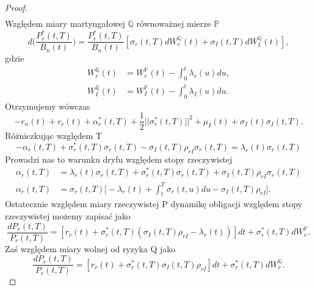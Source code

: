 \documentclass{mini}
\theoremstyle{mythstyle}
\begin{document}
\begin{proof}
\begin{align*}
	\end{align*}
	Względem miary martyngałowej $\mathbb{Q}$ równoważnej mierze $\mathbb{P}$
	\begin{equation*}
	d\bigg(	\frac{P_r^*(t,T)}{B_n(t)}\bigg) = \frac{P_r^*(t,T)}{B_n(t)} [\sigma_r(t,T)dW_r^\mathbb{Q}(t) + \sigma_I(t,T)dW_I^\mathbb{Q}(t)],
	\end{equation*}
	gdzie
	\begin{align*}
	W_r^\mathbb{Q}(t) &= W_r^\mathbb{P}(t) - \int_{0}^{t} \lambda_r(u) du, \\
	W_I^\mathbb{Q}(t) &= W_I^\mathbb{P}(t) - \int_{0}^{t} \lambda_I(u) du.
	\end{align*}
	Otrzymujemy wówczas
	\begin{equation}
	-r_n(t) + r_r(t) + \alpha_r^*(t,T) + \frac{1}{2} ||\sigma_r^*(t,T)||^2 + \mu_I(t) + \sigma_I(t)\sigma_I(t,T).
	\end{equation}
	Różniczkując względem T
	\begin{equation}
	-\alpha_r(t,T) + \sigma_r^*(t,T)\sigma_r(t,T)-\sigma_I(t,T)\rho_{rI}\sigma_r(t,T) = \lambda_r(t)\sigma_r(t,T)
	\end{equation}
	Prowadzi nas to warunku dryfu względem stopy rzeczywistej
	\begin{align*}
	\alpha_r(t,T) &= \lambda_r(t)\sigma_r(t,T) + \sigma_r^*(t,T)\sigma_r(t,T)+\sigma_I(t,T)\rho_{rI}\sigma_r(t,T) \\
	\alpha_r(t,T) &= \sigma_r(t,T)\bigg[ -\lambda_r(t) + \int_{t}^{T}\sigma_r(t,u) du - \sigma_I(t,T)\rho_{rI}\bigg].
	\end{align*}
	Ostatecznie względem miary rzeczywistej P dynamikę obligacji względem stopy rzeczywistej możemy zapisać jako
	\begin{equation}
	\frac{dP_r(t,T)}{P_r(t,T)} = [r_r(t) +\sigma^*_r(t,T)(\sigma_I(t,T)\rho_{rI}-\lambda_r(t))]dt + \sigma^*_r(t,T)dW^\mathbb{P}_r.
	\end{equation}
	Zaś względem miary wolnej od ryzyka Q jako
	\begin{equation}
	\frac{dP_r(t,T)}{P_r(t,T)} = [r_r(t) +\sigma^*_r(t,T)\sigma_I(t,T)\rho_{rI}]dt + \sigma^*_r(t,T)dW^\mathbb{Q}_r.
	\end{equation}

		\end{proof}
\end{document}
